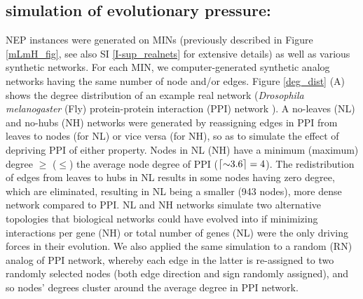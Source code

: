 \subsection{simulation of evolutionary pressure:}
      NEP instances were generated on MINs (previously described in Figure \ref{mLmH_fig}, see also SI \ref{I-sup_realnets} for extensive details) as well as various synthetic networks. For each MIN, we computer-generated synthetic analog networks having the same number of node and/or edges. Figure \ref{deg_dist} (A) shows the degree distribution of an example real network (\textit{Drosophila melanogaster} (Fly) protein-protein interaction (PPI) network \cite{vinayagam_integrating_2014}).
      A no-leaves (NL) and no-hubs (NH) networks were generated by reassigning edges in PPI from leaves to nodes (for NL) or vice versa (for NH),
      so as to simulate the effect of depriving PPI of either property.
      Nodes in NL (NH) have a minimum (maximum) degree  $\geq$ ($\leq$) the average
      node degree of PPI ($\ceil{{\sim}3.6}=4$). The redistribution of edges from leaves to hubs in NL results in some nodes having zero degree, which are eliminated,
      resulting in NL being a smaller (943 nodes), more dense network compared to PPI.
      NL and NH networks
      simulate two alternative topologies that biological networks could have evolved into if minimizing interactions per gene (NH) or total number of genes (NL)
      were the only driving forces in their evolution.
      We also applied the same simulation to a random (RN)  analog of PPI network, whereby each edge in the latter is re-assigned to two randomly selected nodes
      (both edge direction and sign
      randomly assigned), and so nodes' degrees cluster around the average degree in PPI network.
